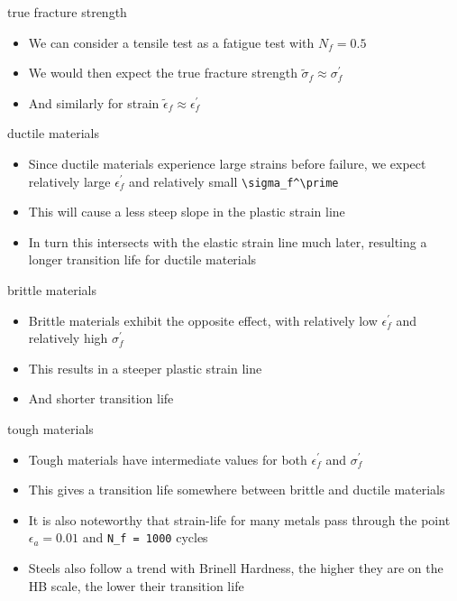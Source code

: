 \documentclass[
  letterpaper,
  ignorenonframetext,
  aspectratio=43,
  handout,
  12pt]{beamer}
\providecommand{\tightlist}{%
  \setlength{\itemsep}{0pt}\setlength{\parskip}{0pt}}
\providecommand{\tightlist}{%
\setlength{\itemsep}{0pt}\setlength{\parskip}{0pt}}
\begin{document}
\begin{frame}{true fracture strength}
\protect\hypertarget{true-fracture-strength}{}
\begin{itemize}
\tightlist
\item
  We can consider a tensile test as a fatigue test with \(N_f = 0.5\)
\item
  We would then expect the true fracture strength
  \(\tilde{\sigma}_f \approx \sigma_f^\prime\)
\item
  And similarly for strain
  \(\tilde{\epsilon}_f \approx \epsilon_f^\prime\)
\end{itemize}
\end{frame}

\begin{frame}[fragile]{ductile materials}
\protect\hypertarget{ductile-materials}{}
\begin{itemize}
\tightlist
\item
  Since ductile materials experience large strains before failure, we
  expect relatively large \(\epsilon_f^\prime\) and relatively small
  \texttt{\textbackslash{}sigma\_f\^{}\textbackslash{}prime}
\item
  This will cause a less steep slope in the plastic strain line
\item
  In turn this intersects with the elastic strain line much later,
  resulting a longer transition life for ductile materials
\end{itemize}
\end{frame}

\begin{frame}{brittle materials}
\protect\hypertarget{brittle-materials}{}
\begin{itemize}
\tightlist
\item
  Brittle materials exhibit the opposite effect, with relatively low
  \(\epsilon_f^\prime\) and relatively high \(\sigma_f^\prime\)
\item
  This results in a steeper plastic strain line
\item
  And shorter transition life
\end{itemize}
\end{frame}

\begin{frame}[fragile]{tough materials}
\protect\hypertarget{tough-materials}{}
\begin{itemize}
\tightlist
\item
  Tough materials have intermediate values for both
  \(\epsilon_f^\prime\) and \(\sigma_f^\prime\)
\item
  This gives a transition life somewhere between brittle and ductile
  materials
\item
  It is also noteworthy that strain-life for many metals pass through
  the point \(\epsilon_a = 0.01\) and \texttt{N\_f\ =\ 1000} cycles
\item
  Steels also follow a trend with Brinell Hardness, the higher they are
  on the HB scale, the lower their transition life
\end{itemize}
\end{frame}
\end{document}
